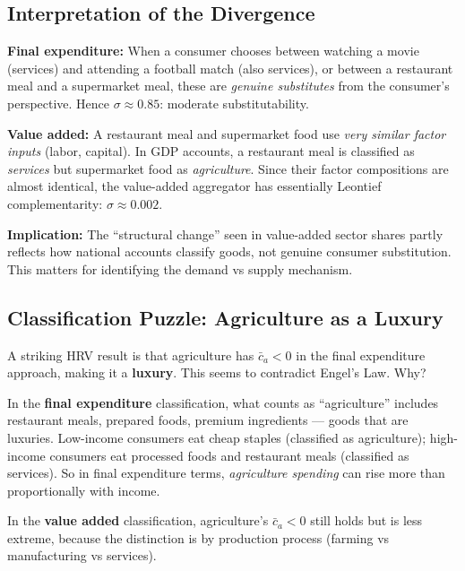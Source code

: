 \documentclass[a4paper,11pt]{article}
\begin{document}
\subsection*{Interpretation of the Divergence}

\begin{derivationbox}[title={Why Do the Two Approaches Disagree?}]
\textbf{Final expenditure:} When a consumer chooses between watching a movie (services) and attending a football match (also services), or between a restaurant meal and a supermarket meal, these are \emph{genuine substitutes} from the consumer's perspective. Hence $\sigma \approx 0.85$: moderate substitutability.

\textbf{Value added:} A restaurant meal and supermarket food use \emph{very similar factor inputs} (labor, capital). In GDP accounts, a restaurant meal is classified as \emph{services} but supermarket food as \emph{agriculture}. Since their factor compositions are almost identical, the value-added aggregator has essentially Leontief complementarity: $\sigma \approx 0.002$.

\textbf{Implication:} The ``structural change'' seen in value-added sector shares partly reflects how national accounts classify goods, not genuine consumer substitution. This matters for identifying the demand vs supply mechanism.
\end{derivationbox}

\subsection*{Classification Puzzle: Agriculture as a Luxury}

A striking HRV result is that agriculture has $\bar{c}_a < 0$ in the final expenditure approach, making it a \textbf{luxury}. This seems to contradict Engel's Law. Why?

\begin{resultbox}
In the \textbf{final expenditure} classification, what counts as ``agriculture'' includes restaurant meals, prepared foods, premium ingredients — goods that are luxuries. Low-income consumers eat cheap staples (classified as agriculture); high-income consumers eat processed foods and restaurant meals (classified as services). So in final expenditure terms, \emph{agriculture spending} can rise more than proportionally with income.

In the \textbf{value added} classification, agriculture's $\bar{c}_a < 0$ still holds but is less extreme, because the distinction is by production process (farming vs manufacturing vs services).
\end{resultbox}
\end{document}
